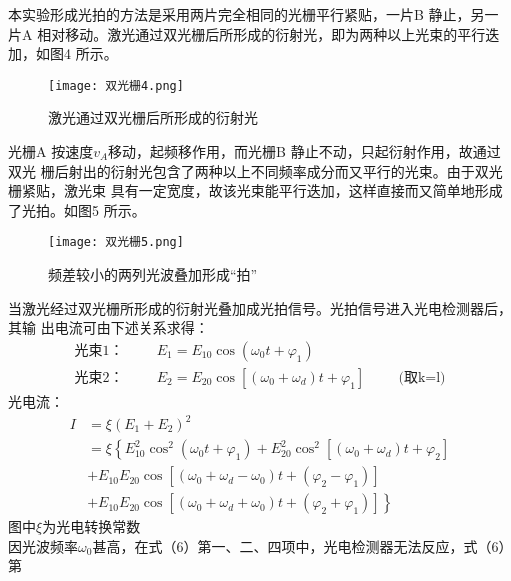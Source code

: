 \documentclass[dvipsnames, svgnames,a4paper,11pt]{article}
\begin{document}
\begin{enumerate}
    本实验形成光拍的方法是采用两片完全相同的光栅平行紧贴，一片B 静止，另一片A
    相对移动。激光通过双光栅后所形成的衍射光，即为两种以上光束的平行迭加，如图4 所示。
    \begin{figure}[H]
        \centering
        \texttt{[image: 双光栅4.png]}
        \caption{激光通过双光栅后所形成的衍射光}
    \end{figure}
    光栅A 按速度$v_A$移动，起频移作用，而光栅B 静止不动，只起衍射作用，故通过双光
    栅后射出的衍射光包含了两种以上不同频率成分而又平行的光束。由于双光栅紧贴，激光束
    具有一定宽度，故该光束能平行迭加，这样直接而又简单地形成了光拍。如图5 所示。
    \begin{figure}[H]
        \centering
        \texttt{[image: 双光栅5.png]}
        \caption{频差较小的两列光波叠加形成“拍”}
    \end{figure}
    当激光经过双光栅所形成的衍射光叠加成光拍信号。光拍信号进入光电检测器后，其输
    出电流可由下述关系求得：
    \begin{equation}
        \begin{aligned}
            \text{光束1：}\hspace{1cm}E_1=E_{10}\cos(\omega_0t+\varphi_1)\\
            \text{光束2：}\hspace{1cm}E_2=E_{20}\cos[(\omega_0+\omega_d)t+\varphi_1]\hspace{1cm}\text{(取k=l)}
        \end{aligned}
    \end{equation}
    光电流：
    \begin{equation}
        \begin{aligned}
            I&=\xi\left(E_{1}+E_{2}\right)^{2} \\
            &=\xi\left\{E_{10}^{2} \cos ^{2}\left(\omega_{0} t+\varphi_{1}\right)+E_{20}^{2} \cos ^{2}\left[\left(\omega_{0}+\omega_{d}\right) t+\varphi_{2}\right]\right. \\
            &+E_{10} E_{20} \cos \left[\left(\omega_{0}+\omega_{d}-\omega_{0}\right) t+\left(\varphi_{2}-\varphi_{1}\right)\right] \\
            &\left.+E_{10} E_{20} \cos \left[\left(\omega_{0}+\omega_{d}+\omega_{0}\right) t+\left(\varphi_{2}+\varphi_{1}\right)\right]\right\}
        \end{aligned}
    \end{equation}
    图中$\xi$为光电转换常数\\
    因光波频率$\omega_0$甚高，在式（6）第一、二、四项中，光电检测器无法反应，式（6）第

\end{enumerate}
\end{document}
